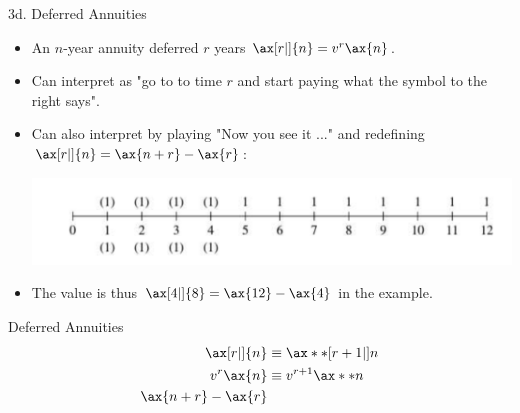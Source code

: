 \begin{CHPT_SUMM_AUTO}[label = {L.-3d}]{3d. Deferred Annuities}
\begin{itemize}[leftmargin = *]
		\item	An $n$-year annuity deferred $r$ years $\ax[r|]{n} = v^{r} \ax{n}$.
		\item	Can interpret as "go to to time $r$ and start paying what the symbol to the right says".
		\item	Can also interpret by playing "Now you see it ..." and redefining $\ax[r|]{n} = \ax{n + r} - \ax{r}$:
		\begin{center}
			\includegraphics[scale=0.4]{img/deferred-annuities-nowyouseeit.png}
		\end{center}
		\item[]	The value is thus $\ax[4|]{8} = \ax{12} - \ax{4}$ in the example.		
\end{itemize}

\begin{FORMULA_SUMM}{Deferred Annuities}
\begin{align*}
	\ax[r|]{n} &\equiv \ax**[r + 1| ]{n}	\\
	v^{r} \ax{n}	&\equiv	v^{r + 1} \ax**{n}	\\
	\ax{n + r} - \ax{r}
\end{align*}
\end{FORMULA_SUMM}
\end{CHPT_SUMM_AUTO}

